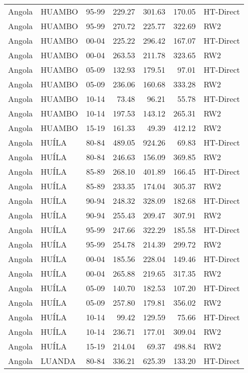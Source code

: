 \begin{longtable}{lllrrrl}
  Angola & HUAMBO & 95-99 & 229.27 & 301.63 & 170.05 & HT-Direct \\ 
  Angola & HUAMBO & 95-99 & 270.72 & 225.77 & 322.69 & RW2 \\ 
  Angola & HUAMBO & 00-04 & 225.22 & 296.42 & 167.07 & HT-Direct \\ 
  Angola & HUAMBO & 00-04 & 263.53 & 211.78 & 323.65 & RW2 \\ 
  Angola & HUAMBO & 05-09 & 132.93 & 179.51 & 97.01 & HT-Direct \\ 
  Angola & HUAMBO & 05-09 & 236.06 & 160.68 & 333.28 & RW2 \\ 
  Angola & HUAMBO & 10-14 & 73.48 & 96.21 & 55.78 & HT-Direct \\ 
  Angola & HUAMBO & 10-14 & 197.53 & 143.12 & 265.31 & RW2 \\ 
  Angola & HUAMBO & 15-19 & 161.33 & 49.39 & 412.12 & RW2 \\ 
  Angola & HUÍLA & 80-84 & 489.05 & 924.26 & 69.83 & HT-Direct \\ 
  Angola & HUÍLA & 80-84 & 246.63 & 156.09 & 369.85 & RW2 \\ 
  Angola & HUÍLA & 85-89 & 268.10 & 401.89 & 166.45 & HT-Direct \\ 
  Angola & HUÍLA & 85-89 & 233.35 & 174.04 & 305.37 & RW2 \\ 
  Angola & HUÍLA & 90-94 & 248.32 & 328.09 & 182.68 & HT-Direct \\ 
  Angola & HUÍLA & 90-94 & 255.43 & 209.47 & 307.91 & RW2 \\ 
  Angola & HUÍLA & 95-99 & 247.66 & 322.29 & 185.58 & HT-Direct \\ 
  Angola & HUÍLA & 95-99 & 254.78 & 214.39 & 299.72 & RW2 \\ 
  Angola & HUÍLA & 00-04 & 185.56 & 228.04 & 149.46 & HT-Direct \\ 
  Angola & HUÍLA & 00-04 & 265.88 & 219.65 & 317.35 & RW2 \\ 
  Angola & HUÍLA & 05-09 & 140.70 & 182.53 & 107.20 & HT-Direct \\ 
  Angola & HUÍLA & 05-09 & 257.80 & 179.81 & 356.02 & RW2 \\ 
  Angola & HUÍLA & 10-14 & 99.42 & 129.59 & 75.66 & HT-Direct \\ 
  Angola & HUÍLA & 10-14 & 236.71 & 177.01 & 309.04 & RW2 \\ 
  Angola & HUÍLA & 15-19 & 214.04 & 69.37 & 498.84 & RW2 \\ 
  Angola & LUANDA & 80-84 & 336.21 & 625.39 & 133.20 & HT-Direct \\ 

\end{longtable}
